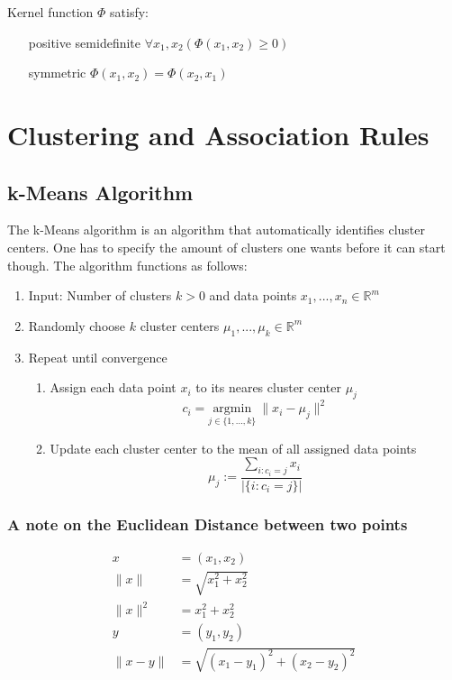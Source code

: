 \documentclass[a4paper, 11pt]{article}
\begin{document}
Kernel function $\Phi$ satisfy:
\begin{enumerate}[leftmargin=*, labelindent=5cm, labelsep=0.5cm]
	\item[positive semidefinite]$\forall x_1,x_2(\Phi(x_1,x_2)\geq 0)$
	\item[symmetric] $\Phi(x_1,x_2) = \Phi(x_2,x_1)$
\end{enumerate}

\section{Clustering and Association Rules}

\subsection{k-Means Algorithm}

The k-Means algorithm is an algorithm that automatically identifies cluster centers. One has to specify the amount of clusters one wants before it can start though. The algorithm functions as follows:

\begin{enumerate}
	\item Input: Number of clusters $k>0$ and data points $x_1,...,x_n \in \mathbb{R}^m$
	\item Randomly choose $k$ cluster centers $\mu_1,...,\mu_k \in \mathbb{R}^m$
	\item Repeat until convergence
	\begin{enumerate}
		\item Assign each data point $x_i$ to its neares cluster center $\mu_j$
		\begin{equation*}
			c_i = \underset{j\in\{1,...,k\}}{\text{argmin}}\ \| x_i - \mu_j \|^2
		\end{equation*}
		\item  Update each cluster center to the mean of all assigned data points
		\begin{equation*}
			\mu_j := \frac{\sum_{i:c_i=j} x_i}{|\{i:c_i = j\}|}
		\end{equation*}
	\end{enumerate}
\end{enumerate}

\subsubsection{A note on the Euclidean Distance between two points}
\begin{align*}
	x &= (x_1,x_2)\\
	\| x \| &= \sqrt{x_1^2 + x_2^2}\\
	\| x \|^2 &= x_1^2 + x_2^2\\
	y &= (y_1, y_2)\\
	\| x - y \| &= \sqrt{(x_1 - y_1)^2 + (x_2 - y_2)^2}
\end{align*}
\end{document}
